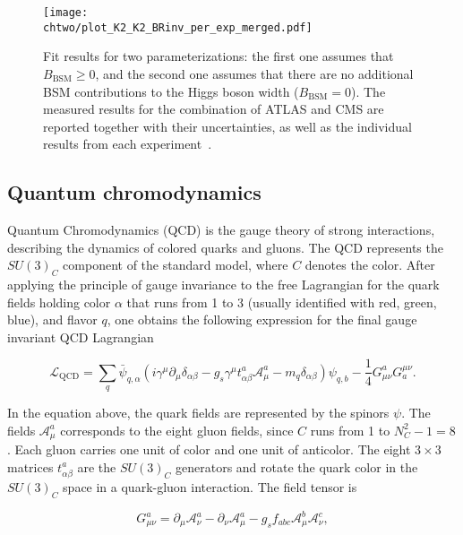   \begin{figure}[!htb]
  \centering
  \texttt{[image: \\chtwo/plot\_K2\_K2\_BRinv\_per\_exp\_merged.pdf]}
  \caption{Fit results for two parameterizations: the first one assumes that $B_\mathrm{BSM} \geq 0$, and the second one assumes that there are no additional BSM contributions to the Higgs boson width ($B_\mathrm{BSM} = 0$). The measured results for the combination of ATLAS and CMS are reported together with their uncertainties, as well as the individual results from each experiment~\cite{Aad:2015zhl}.}
  \label{fig:HiggsCoupl}
\end{figure} 

\subsection{Quantum chromodynamics}\label{subsec:QCD}

Quantum Chromodynamics (QCD) is the gauge theory of strong interactions, describing the dynamics of colored quarks and gluons.
The QCD represents the $SU(3)_C$ component of the standard model, where $C$ denotes the color.
After applying the principle of gauge invariance to the free Lagrangian for the quark fields holding color $\alpha$ that runs from 1 to 3 (usually identified with red, green, blue), and flavor $q$, one obtains the following expression for the final gauge invariant QCD Lagrangian

\begin{equation}\label{eqn:SM_e46}
\mathcal{L}_\mathrm{QCD} = \sum_{q} \bar{\psi}_{q,\alpha} (i\gamma^\mu\partial_\mu\delta_{\alpha\beta} - g_s\gamma^\mu t^a_{\alpha\beta}\mathcal{A}^a_\mu - m_q\delta_{\alpha\beta})\psi_{q,b} - \frac{1}{4}G^a_{\mu\nu}G^{\mu\nu}_a.
\end{equation}

In the equation above, the quark fields are represented by the spinors $\psi$. The fields $\mathcal{A}^a_\mu$ corresponds to the eight gluon fields, since $C$ runs from 1 to $N^2_C - 1 = 8$.
Each gluon carries one unit of color and one unit of anticolor.
The eight $3\times3$ matrices $t^a_{\alpha\beta}$ are the $SU(3)_C$ generators and rotate the quark color in the $SU(3)_C$ space in a quark-gluon interaction.
The field tensor is

\begin{equation}\label{eqn:SM_e47}
G^a_{\mu\nu} = \partial_\mu\mathcal{A}^a_\nu - \partial_\nu\mathcal{A}^a_\mu - g_s f_{abc}\mathcal{A}^b_\mu\mathcal{A}^c_\nu,
\end{equation}


